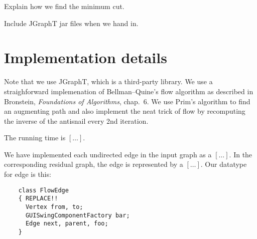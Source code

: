 \documentclass{tufte-handout}
\begin{document}
  Explain how we find the minimum cut.
  
  Include JGraphT jar files when we hand in.

  \section{Implementation details}

	Note that we use JGraphT, which is a third-party library.
  We use a straighforward implemenation of Bellman--Quine's flow algorithm as described in Bronstein, \emph{Foundations of Algorithms}, chap.~6.
  We use Prim's algorithm to find an augmenting path and also implement the neat trick of flow by recomputing the inverse of the antisnail every 2nd iteration.

  The running time is $[\ldots]$.

  We have implemented each undirected edge in the input graph as a $[\ldots]$.
  In the corresponding residual graph, the edge is represented by a $[\ldots]$.
  Our datatype for edge is this:
  \begin{verbatim}
    class FlowEdge
    { REPLACE!!
      Vertex from, to;
      GUISwingComponentFactory bar;
      Edge next, parent, foo;
    }
  \end{verbatim}
\end{document}
